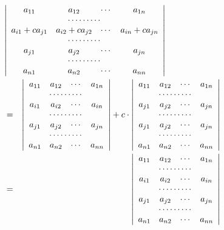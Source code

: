 \begin{enumerate}
\begin{eqnarray*}
\lefteqn{\left|\begin{array}{cccc}a_{11} & a_{12} & \cdots & a_{1n} \\
\multicolumn{4}{c}{\cdots\cdots\cdots}\\
a_{i1}+ca_{j1} & a_{i2}+ca_{j2} & \cdots & a_{in}+ca_{jn}\\
\multicolumn{4}{c}{\cdots\cdots\cdots}\\
a_{j1} & a_{j2} & \cdots & a_{jn} \\
\multicolumn{4}{c}{\cdots\cdots\cdots}\\
a_{n1} & a_{n2} & \cdots & a_{nn}
\end{array}\right|}\\
& = & 
\left|\begin{array}{cccc}a_{11} & a_{12} & \cdots & a_{1n} \\
\multicolumn{4}{c}{\cdots\cdots\cdots}\\
a_{i1} & a_{i2} & \cdots & a_{in}\\
\multicolumn{4}{c}{\cdots\cdots\cdots}\\
a_{j1} & a_{j2} & \cdots & a_{jn} \\
\multicolumn{4}{c}{\cdots\cdots\cdots}\\
a_{n1} & a_{n2} & \cdots & a_{nn}
\end{array}\right| + 
c\cdot \left|\begin{array}{cccc}a_{11} & a_{12} & \cdots & a_{1n} \\
\multicolumn{4}{c}{\cdots\cdots\cdots}\\
a_{j1} & a_{j2} & \cdots & a_{jn}\\
\multicolumn{4}{c}{\cdots\cdots\cdots}\\
a_{j1} & a_{j2} & \cdots & a_{jn} \\
\multicolumn{4}{c}{\cdots\cdots\cdots}\\
a_{n1} & a_{n2} & \cdots & a_{nn}
\end{array}\right|\\
& = & \left|\begin{array}{cccc}a_{11} & a_{12} & \cdots & a_{1n} \\
\multicolumn{4}{c}{\cdots\cdots\cdots}\\
a_{i1} & a_{i2} & \cdots & a_{in}\\
\multicolumn{4}{c}{\cdots\cdots\cdots}\\
a_{j1} & a_{j2} & \cdots & a_{jn} \\
\multicolumn{4}{c}{\cdots\cdots\cdots}\\
a_{n1} & a_{n2} & \cdots & a_{nn}
\end{array}\right|
\end{eqnarray*}
\end{enumerate}


